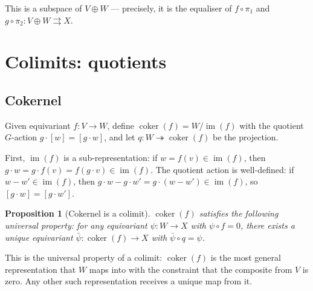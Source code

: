 \documentclass[12pt,a4paper]{article}
\newtheorem{proposition}[theorem]{Proposition}
\theoremstyle{definition}
\theoremstyle{remark}
\newcommand{\im}{\operatorname{im}}
\newcommand{\coker}{\operatorname{coker}}
\begin{document}
This is a subspace of $V \oplus W$ --- precisely, it is the equaliser of
$f \circ \pi_1$ and $g \circ \pi_2\colon V \oplus W \rightrightarrows X$.

\section{Colimits: quotients}

\subsection{Cokernel}

Given equivariant $f\colon V \to W$, define
$\coker(f) = W / \im(f)$ with the quotient $G$-action $g \cdot [w] = [g \cdot w]$,
and let $q\colon W \twoheadrightarrow \coker(f)$ be the projection.

\medskip
\begin{center}
\end{center}

First, $\im(f)$ is a sub-representation: if $w = f(v) \in \im(f)$, then
$g \cdot w = g \cdot f(v) = f(g \cdot v) \in \im(f)$. The quotient action is
well-defined: if $w - w' \in \im(f)$, then
$g \cdot w - g \cdot w' = g \cdot (w - w') \in \im(f)$, so $[g \cdot w] = [g \cdot w']$.

\begin{proposition}[Cokernel is a colimit]
$\coker(f)$ satisfies the following universal property: for any equivariant
$\psi\colon W \to X$ with $\psi \circ f = 0$, there exists a unique equivariant
$\bar\psi\colon \coker(f) \to X$ with $\bar\psi \circ q = \psi$.
\end{proposition}

\begin{center}
\end{center}

This is the universal property of a colimit: $\coker(f)$ is the most general
representation that $W$ maps into with the constraint that the composite from $V$
is zero. Any other such representation receives a unique map from it.
\end{document}
